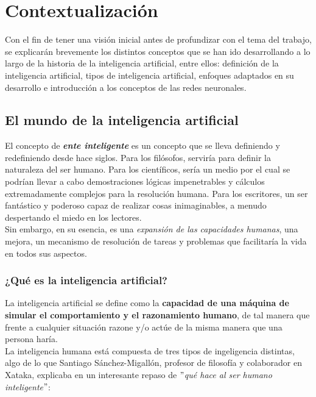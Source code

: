 
\chapter{Contextualización}\label{contextualizacion}

Con el fin de tener una visión inicial antes de profundizar con el tema del trabajo, se explicarán brevemente los distintos conceptos que se han ido desarrollando a lo largo de la historia de la inteligencia artificial, entre ellos: definición de la inteligencia artificial, tipos de inteligencia artificial, enfoques adaptados en su desarrollo e introducción a los conceptos de las redes neuronales. ~\cite{copeland2020ai}  

\section{El mundo de la inteligencia artificial}

El concepto de \textbf{\textit{ente inteligente}} es un concepto que se lleva definiendo y redefiniendo desde hace siglos. Para los filósofos, serviría para definir la naturaleza del ser humano. Para los científicos, sería un medio por el cual se podrían llevar a cabo demostraciones lógicas impenetrables y cálculos extremadamente complejos para la resolución humana. Para los escritores, un ser fantástico y poderoso capaz de realizar cosas inimaginables, a menudo despertando el miedo en los lectores. \\

Sin embargo, en su esencia, es una \textit{expansión de las capacidades humanas}, una mejora, un mecanismo de resolución de tareas y problemas que facilitaría la vida en todos sus aspectos.~\cite{buchanan2005very}

\subsection{¿Qué es la inteligencia artificial?}

La inteligencia artificial se define como la \textbf{capacidad de una máquina de simular el comportamiento y el razonamiento humano}, de tal manera que frente a cualquier situación razone y/o actúe de la misma manera que una persona haría. \\

La inteligencia humana está compuesta de tres tipos de ingeligencia distintas, algo de lo que Santiago Sánchez-Migallón, profesor de filosofía y colaborador en Xataka, explicaba en un interesante repaso de $"$\textit{qué hace al ser humano inteligente}$"$: \cite{pastor2008inteligencia}

